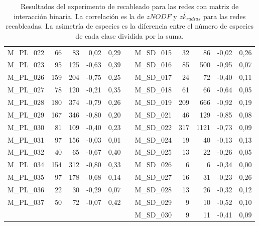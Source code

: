 \begin{table}[ht!]
\begin{tabular}{lrrrrrlrrrr}
    M\_PL\_022 & 66   & 83   & 0,02 & 0,29 &      & M\_SD\_015 & 32   & 86   & -0,02 & 0,26 \\
    M\_PL\_023 & 95   & 125  & -0,63 & 0,39 &      & M\_SD\_016 & 85   & 500  & -0,95 & 0,07 \\
    M\_PL\_026 & 159  & 204  & -0,75 & 0,25 &      & M\_SD\_017 & 24   & 72   & -0,40 & 0,11 \\
    M\_PL\_027 & 78   & 120  & -0,21 & 0,35 &      & M\_SD\_018 & 61   & 66   & -0,64 & 0,05 \\
    M\_PL\_028 & 180  & 374  & -0,79 & 0,26 &      & M\_SD\_019 & 209  & 666  & -0,92 & 0,19 \\
    M\_PL\_029 & 167  & 346  & -0,80 & 0,20 &      & M\_SD\_021 & 46   & 129  & -0,85 & 0,08 \\
    M\_PL\_030 & 81   & 109  & -0,40 & 0,23 &      & M\_SD\_022 & 317  & 1121 & -0,73 & 0,09 \\
    M\_PL\_031 & 97   & 156  & -0,03 & 0,01 &      & M\_SD\_024 & 19   & 40   & -0,13 & 0,13 \\
    M\_PL\_032 & 40   & 65   & -0,67 & 0,40 &      & M\_SD\_025 & 13   & 22   & -0,26 & 0,05 \\
    M\_PL\_034 & 154  & 312  & -0,80 & 0,33 &      & M\_SD\_026 & 6    & 6    & -0,34 & 0,00 \\
    M\_PL\_035 & 97   & 178  & -0,68 & 0,14 &      & M\_SD\_027 & 16   & 31   & -0,23 & 0,26 \\
    M\_PL\_036 & 22   & 30   & -0,29 & 0,07 &      & M\_SD\_028 & 13   & 26   & -0,32 & 0,12 \\
    M\_PL\_037 & 50   & 72   & -0,07 & 0,42 &      & M\_SD\_029 & 9    & 10   & -0,52 & 0,10 \\
         &      &      &      &      &      & M\_SD\_030 & 9    & 11   & -0,41 & 0,09 \\
    \bottomrule
    \end{tabular}%
    \caption{\label{table:table_results_recableados} Resultados del experimento de recableado para las redes con matriz de interacción binaria. La correlación es la de $zNODF$ y $z \overline {k}_{radius}$ para las redes recableadas. La asimetría de especies es la diferencia entre el número de especies de cada clase dividida por la suma.}
\end{table}%